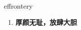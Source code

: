 
\begin{frame}
{\huge effrontery}
\begin{center}
\begin{enumerate}\Large
  \item \textbf{厚颜无耻，放肆大胆}
\end{enumerate}
\end{center}
\end{frame}
